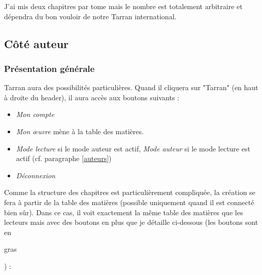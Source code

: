 \documentclass[french]{report}
\theoremstyle{plain}
\begin{document}
			J'ai mis deux chapitres par tome mais le nombre est totalement arbitraire et dépendra du bon vouloir de notre Tarran international.

		\subsection{Côté auteur}
			\subsubsection{Présentation générale}

				Tarran aura des possibilités particulières. Quand il cliquera sur "Tarran" (en haut à droite du header), il aura accès aux boutons suivants :
				\begin{itemize}
					\item \emph{Mon compte}
					\item \emph{Mon \oe{}uvre} mène à la table des matières.
					\item \emph{Mode lecture} si le mode auteur est actif, \emph{Mode auteur} si le mode lecture est actif (cf. paragraphe \ref{auteurs})
					\item \emph{Déconnexion}
				\end{itemize}
				Comme la structure des chapitres est particulièrement compliquée, la création se fera à partir de la table des matières (possible uniquement quand il est connecté bien sûr). Dans ce cas, il voit exactement la même table des matières que les lecteurs mais avec des boutons en plus que je détaille ci-dessous (les boutons sont en \begin{bfseries} gras \end{bfseries}) :
\end{document}
